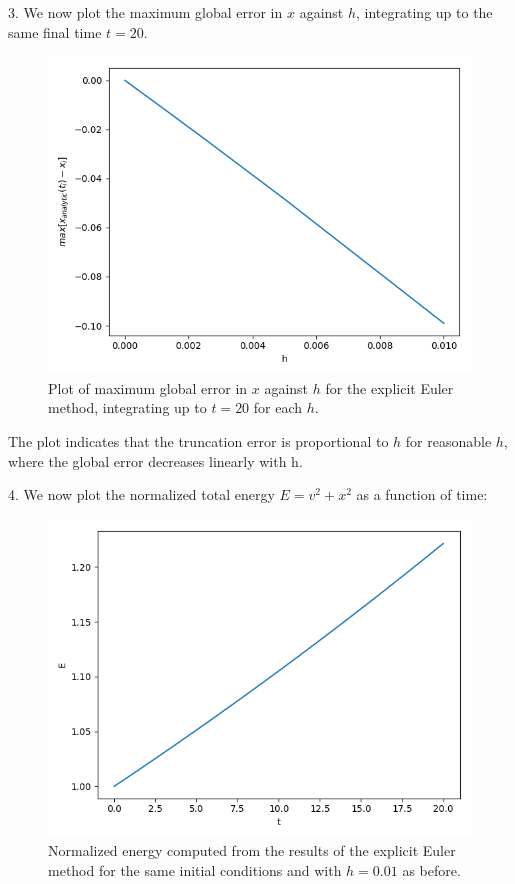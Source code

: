 \documentclass[11pt]{article}
\begin{document}
3. We now plot the maximum global error in $x$ against $h$, integrating up to the same final time $t = 20$.
\begin{figure}[htp]
\centering
\includegraphics[scale=0.70]{err_behavior.png}
\caption{Plot of maximum global error in $x$ against $h$ for the explicit Euler method, integrating up to $t=20$ for each $h$.}
\label{expliciterrbehavior}
\end{figure}

The plot indicates that the truncation error is proportional to $h$ for reasonable $h$, where the global error decreases linearly with h.
\newpage

4. We now plot the normalized total energy $E=v^2 + x^2$ as a function of time:
\begin{figure}[htp]
\centering
\includegraphics[scale=0.7]{euler_energy.png}
\caption{Normalized energy computed from the results of the explicit Euler method for the same initial conditions and with $h=0.01$ as before.}
\label{eulerenergy}
\end{figure}
\end{document}
